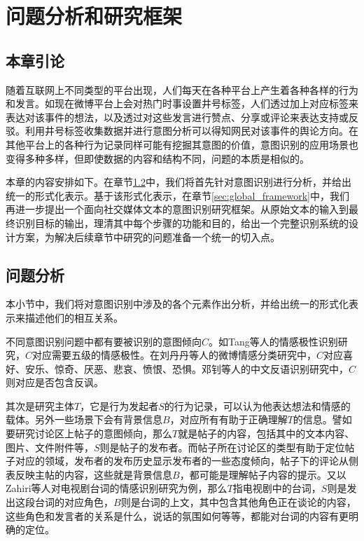 \chapter{问题分析和研究框架}
\label{cha:problem_framework}

\section{本章引论}

随着互联网上不同类型的平台出现，人们每天在各种平台上产生着各种各样的行为和发言。如现在微博平台上会对热门时事设置井号标签，人们透过加上对应标签来表达对该事件的想法，以及透过对这些发言进行赞点、分享或评论来表达支持或反驳。利用井号标签收集数据并进行意图分析可以得知网民对该事件的舆论方向。在其他平台上的各种行为记录同样可能有挖掘其意图的价值，意图识别的应用场景也变得多种多样，但即使数据的内容和结构不同，问题的本质是相似的。

本章的内容安排如下。在章节\ref{sec:global_problem_analysis}中，我们将首先针对意图识别进行分析，并给出统一的形式化表示。基于该形式化表示，在章节\ref{sec:global_framework}中，我们再进一步提出一个面向社交媒体文本的意图识别研究框架。从原始文本的输入到最终识别目标的输出，理清其中每个步骤的功能和目的，给出一个完整识别系统的设计方案，为解决后续章节中研究的问题准备一个统一的切入点。

\section{问题分析}
\label{sec:global_problem_analysis}

本小节中，我们将对意图识别中涉及的各个元素作出分析，并给出统一的形式化表示来描述他们的相互关系。

不同意图识别问题中都有要被识别的意图倾向$C$。如Tang等人\cite{tang2015learning}的情感极性识别研究，$C$对应需要五级的情感极性。在刘丹丹等人\cite{刘丹丹2015基于}的微博情感分类研究中，$C$对应喜好、安乐、惊奇、厌恶、悲哀、愤恨、恐惧。邓钊等人\cite{2015面向微博的中文反语识别研究}的中文反语识别研究中，$C$则对应是否包含反讽。

其次是研究主体$T$，它是行为发起者$S$的行为记录，可以认为他表达想法和情感的载体。另外一些场景下会有背景信息$B$，对应所有有助于正确理解$T$的信息。譬如要研究讨论区上帖子的意图倾向，那么$T$就是帖子的内容，包括其中的文本内容、图片、文件附件等，$S$则是帖子的发布者。而帖子所在讨论区的类型有助于定位帖子对应的领域，发布者的发布历史显示发布者的一些态度倾向，帖子下的评论从侧表反映主帖的内容，这些就是背景信息$B$，都可能是理解帖子内容的提示。又以Zahiri等人\cite{Zahiri2017Emotion}对电视剧台词的情感识别研究为例，那么$T$指电视剧中的台词，$S$则是发出这段台词的对应角色，$B$则是台词的上文，其中包含其他角色正在谈论的内容，这些角色和发言者的关系是什么，说话的氛围如何等等，都能对台词的内容有更明确的定位。

